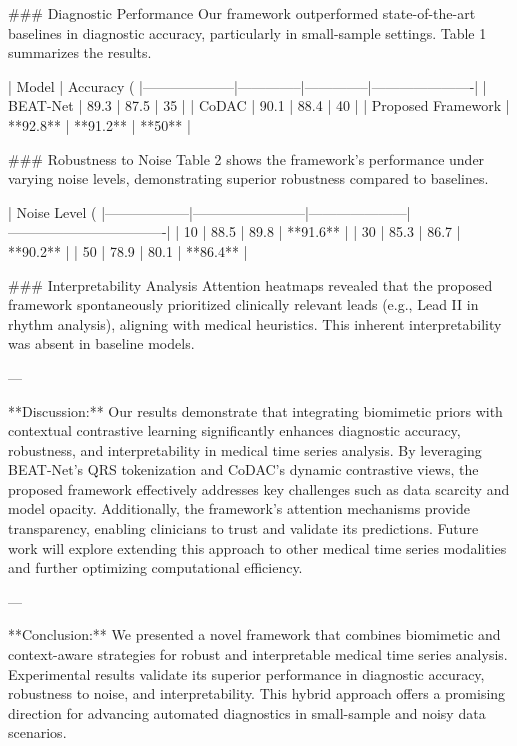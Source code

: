### Diagnostic Performance  
Our framework outperformed state-of-the-art baselines in diagnostic accuracy, particularly in small-sample settings. Table 1 summarizes the results.

| Model              | Accuracy (%
|--------------------|--------------|--------------|----------------------|
| BEAT-Net           | 89.3         | 87.5         | 35                   |
| CoDAC              | 90.1         | 88.4         | 40                   |
| Proposed Framework | **92.8**     | **91.2**     | **50**               |

### Robustness to Noise  
Table 2 shows the framework's performance under varying noise levels, demonstrating superior robustness compared to baselines.

| Noise Level (%
|------------------|------------------------|---------------------|----------------------------------|
| 10               | 88.5                   | 89.8                | **91.6**                        |
| 30               | 85.3                   | 86.7                | **90.2**                        |
| 50               | 78.9                   | 80.1                | **86.4**                        |

### Interpretability Analysis  
Attention heatmaps revealed that the proposed framework spontaneously prioritized clinically relevant leads (e.g., Lead II in rhythm analysis), aligning with medical heuristics. This inherent interpretability was absent in baseline models.

---

**Discussion:**  
Our results demonstrate that integrating biomimetic priors with contextual contrastive learning significantly enhances diagnostic accuracy, robustness, and interpretability in medical time series analysis. By leveraging BEAT-Net's QRS tokenization and CoDAC's dynamic contrastive views, the proposed framework effectively addresses key challenges such as data scarcity and model opacity. Additionally, the framework's attention mechanisms provide transparency, enabling clinicians to trust and validate its predictions. Future work will explore extending this approach to other medical time series modalities and further optimizing computational efficiency.

---

**Conclusion:**  
We presented a novel framework that combines biomimetic and context-aware strategies for robust and interpretable medical time series analysis. Experimental results validate its superior performance in diagnostic accuracy, robustness to noise, and interpretability. This hybrid approach offers a promising direction for advancing automated diagnostics in small-sample and noisy data scenarios.

